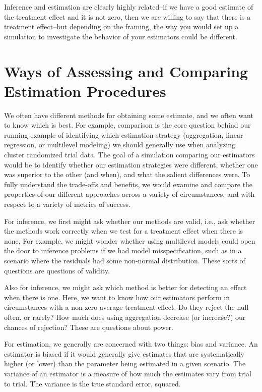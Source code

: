 \documentclass[
]{book}
\begin{document}
Inference and estimation are clearly highly related--if we have a good estimate of the treatment effect and it is not zero, then we are willing to say that there is a treatment effect--but depending on the framing, the way you would set up a simulation to investigate the behavior of your estimators could be different.

\section{Ways of Assessing and Comparing Estimation Procedures}\label{ways-of-assessing-and-comparing-estimation-procedures}

We often have different methods for obtaining some estimate, and we often want to know which is best.
For example, comparison is the core question behind our running example of identifying which estimation strategy (aggregation, linear regression, or multilevel modeling) we should generally use when analyzing cluster randomized trial data.
The goal of a simulation comparing our estimators would be to identify whether our estimation strategies were different, whether one was superior to the other (and when), and what the salient differences were.
To fully understand the trade-offs and benefits, we would examine and compare the properties of our different approaches across a variety of circumstances, and with respect to a variety of metrics of success.

For inference, we first might ask whether our methods are valid, i.e., ask whether the methods work correctly when we test for a treatment effect when there is none.
For example, we might wonder whether using multilevel models could open the door to inference problems if we had model misspecification, such as in a scenario where the residuals had some non-normal distribution.
These sorts of questions are questions of validity.

Also for inference, we might ask which method is better for detecting an effect when there is one.
Here, we want to know how our estimators perform in circumstances with a non-zero average treatment effect.
Do they reject the null often, or rarely?
How much does using aggregation decrease (or increase?) our chances of rejection?
These are questions about power.

For estimation, we generally are concerned with two things: bias and variance.
An estimator is biased if it would generally give estimates that are systematically higher (or lower) than the parameter being estimated in a given scenario.
The variance of an estimator is a measure of how much the estimates vary from trial to trial.
The variance is the true standard error, squared.
\end{document}
